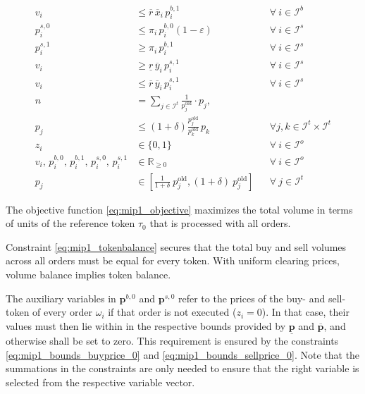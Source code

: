 \documentclass[11pt,parskip=full]{scrartcl}%
\newcommand*{\itokens}{\mathcal{I}^t}       %
\newcommand*{\iorders}{\mathcal{I}^o}       %
\newcommand*{\ibuyorders}{\mathcal{I}^b}    %
\newcommand*{\isellorders}{\mathcal{I}^s}   %
\begin{document}
\begin{small}
\begin{subequations}
\begin{align}
  \\[1mm]
  v_i
  &\le \overline{r} \, \overline{x}_i \, p^{b,1}_i
  && \forall \> i \in \ibuyorders
  \label{eq:mip1_buyorder_volume_ub}
  \\[2mm]
  p^{s,0}_i
  &\le \pi_i \, p^{b,0}_i (1-\varepsilon)
  && \forall \> i \in \isellorders
  \label{eq:mip1_sellorder_disj_0}
  \\[1mm]
  p^{s,1}_i
  &\ge \pi_i \, p^{b,1}_i
  && \forall \> i \in \isellorders
  \label{eq:mip1_sellorder_disj_1}
  \\[1mm]
  v_i
  &\ge \underline{r} \, \overline{y}_i \, p^{s,1}_i
  && \forall \> i \in \isellorders
  \label{eq:mip1_sellorder_volume_lb}
  \\[1mm]
  v_i
  &\le \overline{r} \, \overline{y}_i \, p^{s,1}_i
  && \forall \> i \in \isellorders
  \label{eq:mip1_sellorder_volume_ub}
  \\[2mm]
  n
  &= \sum\limits_{j \in \itokens} \frac{1}{p^\mathrm{old}_j} \cdot p_j,
  \label{eq:mip1_reftoken}
  \\[1mm]
  p_j
  &\le \left(1+\delta\right) \frac{p^\mathrm{old}_j}{p^\mathrm{old}_k} \, p_k
  && \forall j,k \in \itokens \times \itokens
  \label{eq:mip1_maxfluct}
  \\[2mm]
  z_i
  &\in \{0,1\}
  && \forall \> i \in \iorders
  \\[1mm]
  v_i, \, p^{b,0}_i, \, p^{b,1}_i, \, p^{s,0}_i, \, p^{s,1}_i
  &\in \mathbb{R}_{\ge 0}
  && \forall \> i \in \iorders
  \\[1mm]
  p_j
  &\in \left[ \frac{1} {1+\delta} \> p^\mathrm{old}_j, (1+\delta) \> p^\mathrm{old}_j \right]
  && \forall \> j \in \itokens
\end{align}
\label{eq:mip1}
\end{subequations}
\end{small}

The objective function \eqref{eq:mip1_objective} maximizes the total volume in terms of units of
the reference token $ \tau_0 $ that is processed with all orders.

Constraint \eqref{eq:mip1_tokenbalance} secures that the total buy and sell volumes across all 
orders must be equal for every token.
With uniform clearing prices, volume balance implies token balance.

The auxiliary variables in $ \mathbf{p}^{b,0} $ and $ \mathbf{p}^{s,0} $ refer to the prices of the
buy- and sell-token of every order $ \omega_i $ if that order is not executed ($ z_i = 0 $).
In that case, their values must then lie within in the respective bounds provided by
$ \underline{\mathbf{p}} $ and $ \overline{\mathbf{p}} $, and otherwise shall be set to zero.
This requirement is ensured by the constraints \eqref{eq:mip1_bounds_buyprice_0} and
\eqref{eq:mip1_bounds_sellprice_0}.
Note that the summations in the constraints are only needed to ensure that the right variable is
selected from the respective variable vector.
\end{document}
